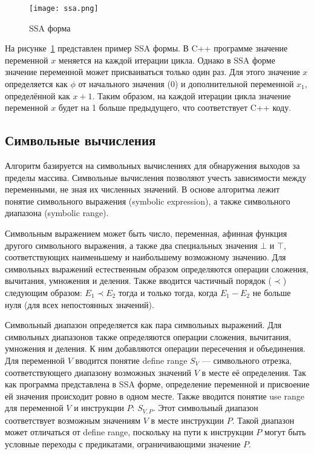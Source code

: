 \begin{figure}
    \texttt{[image: ssa.png]}
    \caption{SSA форма}
    \label{fig:ssa}
\end{figure}

На рисунке~\ref{fig:ssa} представлен пример SSA формы. В C++ программе
значение переменной $x$ меняется на каждой итерации цикла. Однако в
SSA форме значение переменной может присваиваться только один раз. Для
этого значение $x$ определяется как $\phi$ от начального значения
($0$) и дополнительной переменной $x_1$, определённой как $x +
1$. Таким образом, на каждой итерации цикла значение переменной $x$
будет на 1 больше предыдущего, что соответствует C++ коду.

\subsection{Символьные вычисления}

Алгоритм базируется на символьных вычислениях для обнаружения выходов
за пределы массива. Символьные вычисления позволяют учесть зависимости
между переменными, не зная их численных значений. В основе алгоритма
лежит понятие символьного выражения (symbolic expression), а также
символьного диапазона (symbolic range).

Символьным выражением может быть число, переменная, афинная функция
другого символьного выражения, а также два специальных значения $\bot$
и $\top$, соответствующих наименьшему и наибольшему возможному
значению. Для символьных выражений естественным образом определяются
операции сложения, вычитания, умножения и деления. Также вводится
частичный порядок ($\prec$) следующим образом: $E_1 \prec E_2$ тогда и
только тогда, когда $E_1 - E_2$ не больше нуля (для всех непостоянных
значений).

Символьный диапазон определяется как пара символьных выражений. Для
символьных диапазонов также определяются операции сложения, вычитания,
умножения и деления. К ним добавляются операции пересечения и
объединения. Для переменной $V$ вводится понятие define range $S_V$
--- символьного отрезка, соответствующего диапазону возможных значений
$V$ в месте её определения. Так как программа представлена в SSA
форме, определение переменной и присвоение ей значения происходит
ровно в одном месте. Также вводится понятие use range для переменной
$V$ и инструкции $P$: $S_{V,P}$. Этот символьный диапазон
соответствует возможным значениям $V$ в месте инструкции $P$. Такой
диапазон может отличаться от define range, поскольку на пути к
инструкции $P$ могут быть условные переходы с предикатами,
ограничивающими значение $P$.

